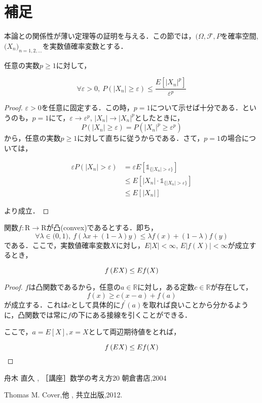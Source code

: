 \documentclass{classes/myclass}
\begin{document}
\section{補足}

本論との関係性が薄い定理等の証明を与える．この節では，$(\Omega, \mathcal{F}, P$を確率空間,$\lparen X_n \rparen_{n = 1, 2,...}$を実数値確率変数とする．

\begin{thm}
任意の実数$p \geq 1$に対して，

\[
  \forall \varepsilon > 0, \  P(|X_n| \ge \varepsilon) \leq \frac{E[{|X_n|^p}]}{\varepsilon^p}
\]
\end{thm}

\begin{proof}
 $\varepsilon > 0$を任意に固定する．この時，$p = 1$について示せば十分である．というのも，$p = 1$にて，$\varepsilon \rightarrow \varepsilon^p$, $|X_n| \rightarrow |X_n|^p$としたときに，
\[
   P(|X_n| \ge \varepsilon) =  P(|X_n|^p \ge \varepsilon^p)
\]
から，任意の実数$p \geq 1$に対して直ちに従うからである．さて，$p = 1$の場合については，

\begin{align*}
  \varepsilon P(|X_n| > \varepsilon) &= \varepsilon E[\mathbb{1}_{\lbrace |X_n| > \varepsilon \rbrace }] \\
  &\leq E[|X_n| \cdot \mathbb{1}_{\lbrace |X_n| > \varepsilon \rbrace}] \\
  &\leq E[|X_n|]
\end{align*}

より成立．
\end{proof}

\begin{thm}[Jensenの不等式]
関数$f: \mathrm{R} \to \mathrm{R}$が凸(convex)であるとする．即ち，
\[
  \forall \lambda \in \lparen 0, 1 \rparen, \  f(\lambda x + (1 - \lambda)y) \leq \lambda f(x) + (1 - \lambda ) f(y)
\]
である．ここで，実数値確率変数$X$に対し，$E|X| < \infty$, $E|f(X)| < \infty$が成立するとき，

\[
  f \left \lparen E X \right \rparen \leq E f(X)
\]
\end{thm}

\begin{proof}
$f$は凸関数であるから，任意の$a \in \mathbb{R}$に対し，ある定数$c \in \mathbb{R}$が存在して，
\[
  f(x) \geq c(x - a) + f(a)
\]
が成立する．これは$c$として具体的に$f^{\prime}(a)$を取れば良いことから分かるように，凸関数では常に$f$の下にある接線を引くことができる．

ここで，$a = E[X], x = X$として両辺期待値をとれば，

\[
  f \left \lparen E X \right \rparen \leq E f(X)
\]
\end{proof}


\begin{thebibliography}{9}

舟木 直久
, ［講座］数学の考え方20
\newblock 朝倉書店,2004

Thomas M. Cover,他
,
\newblock 共立出版,2012.

\end{thebibliography}
\end{document}
